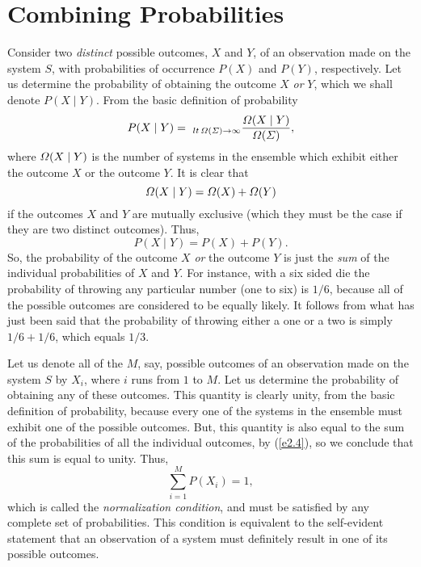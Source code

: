 \section{Combining Probabilities}
Consider two {\em distinct}\/ possible outcomes, $X$ and $Y$, 
of an observation made on the system $S$, with probabilities of
occurrence  $P(X)$ and
$P(Y)$, respectively. Let us  determine the probability of
obtaining the outcome $X$ {\em or}\/ $Y$, which we shall denote $P(X\mid Y)$.
From the basic definition of probability
\begin{equation}
P(X\mid Y) = ~_{lt\,{\mit\Omega}({\mit\Sigma})\rightarrow\infty}
\frac{
{\mit\Omega}(X \mid Y)}{{\mit\Omega}({\mit\Sigma})},
\end{equation}
where ${\mit\Omega}(X \mid Y)$ is the number of systems in the ensemble which exhibit
either the outcome $X$ or the outcome $Y$. It is clear that
\begin{equation}
{\mit\Omega}(X\mid Y) = {\mit\Omega}(X) + {\mit\Omega}(Y)
\end{equation}
if the outcomes $X$ and $Y$ are mutually exclusive (which they must be the case
if they are two distinct outcomes). Thus,
\begin{equation}
P(X\mid Y) = P(X) + P(Y). \label{e2.4}
\end{equation}
So, the probability of the outcome $X$ {\em or}\/ the outcome $Y$ is just the
{\em  sum}
of the individual probabilities of $X$ and $Y$. For instance, with  a six
sided die the probability of throwing any particular number (one to six) is
$1/6$, because all of the possible outcomes are considered to be equally
likely. It follows from what  has just been said that the probability of
throwing either a one or a two is simply  $1/6+1/6$, which equals $1/3$.

Let us denote all of the $M$, say,  possible outcomes of an observation
made on the system $S$ by
$X_i$, where $i$ runs from $1$ to $M$. Let us
determine  the probability of obtaining
any of these outcomes. This quantity is clearly unity,
from the basic definition of probability, because every one  
of the systems in the ensemble must
exhibit one of the possible outcomes. But, this quantity is also equal to
the sum of the probabilities of all the individual outcomes, by (\ref{e2.4}),
so we conclude that
this sum is equal to unity. Thus,
\begin{equation}
\sum_{i=1}^{M} P(X_i) =1,\label{e2.5}
\end{equation}
which is called the {\em normalization condition}, and must be satisfied by
any complete set of probabilities. This condition is equivalent to the
self-evident statement that an observation of a system must definitely
result in one of its possible outcomes. 


